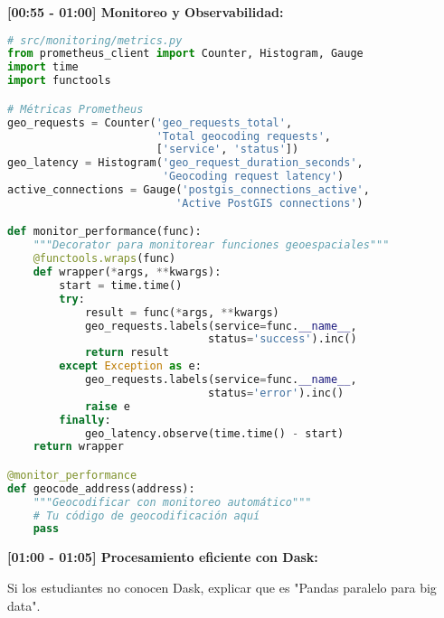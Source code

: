 \documentclass[11pt,a4paper]{article}
\begin{document}
\textbf{[00:55 - 01:00] Monitoreo y Observabilidad:}

\begin{lstlisting}[language=Python]
# src/monitoring/metrics.py
from prometheus_client import Counter, Histogram, Gauge
import time
import functools

# Métricas Prometheus
geo_requests = Counter('geo_requests_total', 
                       'Total geocoding requests',
                       ['service', 'status'])
geo_latency = Histogram('geo_request_duration_seconds',
                        'Geocoding request latency')
active_connections = Gauge('postgis_connections_active',
                          'Active PostGIS connections')

def monitor_performance(func):
    """Decorator para monitorear funciones geoespaciales"""
    @functools.wraps(func)
    def wrapper(*args, **kwargs):
        start = time.time()
        try:
            result = func(*args, **kwargs)
            geo_requests.labels(service=func.__name__, 
                               status='success').inc()
            return result
        except Exception as e:
            geo_requests.labels(service=func.__name__, 
                               status='error').inc()
            raise e
        finally:
            geo_latency.observe(time.time() - start)
    return wrapper

@monitor_performance
def geocode_address(address):
    """Geocodificar con monitoreo automático"""
    # Tu código de geocodificación aquí
    pass
\end{lstlisting}

\textbf{[01:00 - 01:05] Procesamiento eficiente con Dask:}

\begin{alertbox}
Si los estudiantes no conocen Dask, explicar que es "Pandas paralelo para big data".
\end{alertbox}
\end{document}
